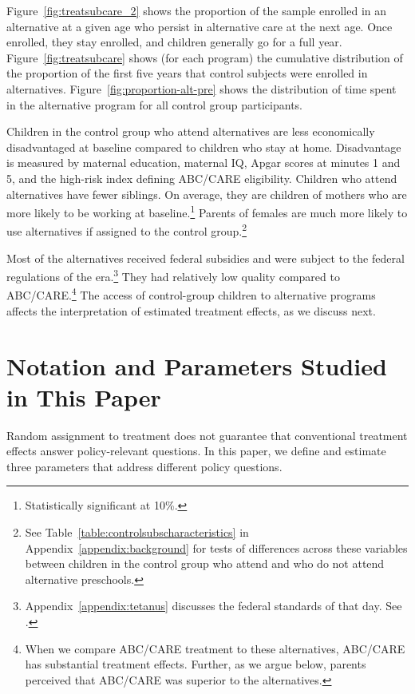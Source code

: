 Figure~\ref{fig:treatsubcare_2} shows the proportion of the sample enrolled in an alternative at a given age who persist in alternative care at the next age. Once enrolled, they stay enrolled, and children generally go for a full year.  Figure~\ref{fig:treatsubcare} shows (for each program) the cumulative distribution of the proportion of the first five years that control subjects were enrolled in alternatives. Figure~\ref{fig:proportion-alt-pre} shows the distribution of time spent in the alternative program for all control group participants.

Children in the control group who attend alternatives are less economically disadvantaged at baseline compared to children who stay at home. Disadvantage is measured by maternal education, maternal IQ, Apgar scores at minutes 1 and 5, and the high-risk index defining ABC/CARE eligibility. Children who attend alternatives have fewer siblings. On average, they are children of mothers who are more likely to be working at baseline.\footnote{Statistically significant at 10\%.} Parents of females are much more likely to use alternatives if assigned to the control group.\footnote{See Table~\ref{table:controlsubscharacteristics} in Appendix~\ref{appendix:background} for tests of differences across these variables between children in the control group who attend and who do not attend alternative preschools.} 

Most of the alternatives received federal subsidies and were subject to the federal regulations of the era.\footnote{Appendix~\ref{appendix:tetanus} discusses the federal standards of that day. See \citet{Department-of-Health_1968_DayCareRequirements,NCGA_1971_House-Bill-100,Ramey-et-al_1977_Intro-to-ABC,Ramey_Campbell_1979_SR,Ramey_McGinness_etal_1982_Abecedarianapproach, Burchinal_Campbell_etal_1997_CD}.} They had relatively low quality compared to ABC/CARE.\footnote{When we compare ABC/CARE treatment to these alternatives, ABC/CARE has substantial treatment effects. Further, as we argue below, parents perceived that ABC/CARE was superior to the alternatives.} The access of control-group children to alternative programs affects the interpretation of estimated treatment effects, as we discuss next.
\section{Notation and Parameters Studied in This Paper} \label{section:methodsquestions}

Random assignment to treatment does not guarantee that conventional treatment effects answer policy-relevant questions. In this paper, we define and estimate three parameters that address different policy questions.

